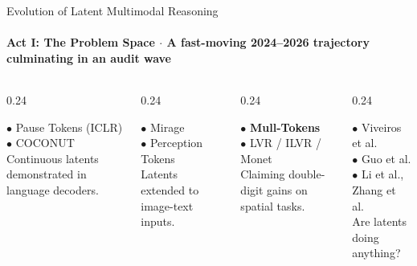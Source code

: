 \documentclass[aspectratio=169, 10pt]{beamer}
\begin{document}
\begin{frame}{Evolution of Latent Multimodal Reasoning}
  \framesubtitle{Act I: The Problem Space $\cdot$ A fast-moving 2024--2026 trajectory culminating in an audit wave}
  
  \vspace{2pt}
  \begin{columns}[T]
    \begin{column}{0.24\textwidth}
      \begin{tcolorbox}[metriccard, title=\textbf{2024: Foundations}]
        \scriptsize
        $\bullet$ Pause Tokens (ICLR)\\
        $\bullet$ COCONUT\\
        Continuous latents demonstrated in language decoders.
      \end{tcolorbox}
    \end{column}
    \begin{column}{0.24\textwidth}
      \begin{tcolorbox}[metriccard, title=\textbf{2025: Multimodal}]
        \scriptsize
        $\bullet$ Mirage\\
        $\bullet$ Perception Tokens\\
        Latents extended to image-text inputs.
      \end{tcolorbox}
    \end{column}
    \begin{column}{0.24\textwidth}
      \begin{tcolorbox}[accentcard, title=\textbf{Early 2026}]
        \scriptsize
        $\bullet$ \textbf{Mull-Tokens}\\
        $\bullet$ LVR / ILVR / Monet\\
        Claiming double-digit gains on spatial tasks.
      \end{tcolorbox}
    \end{column}
    \begin{column}{0.24\textwidth}
      \begin{tcolorbox}[alertcard, title=\textbf{Late 2026: Audits}]
        \scriptsize
        $\bullet$ Viveiros et al.\\
        $\bullet$ Guo et al.\\
        $\bullet$ Li et al., Zhang et al.\\
        \alert{Are latents doing anything?}
      \end{tcolorbox}
    \end{column}
  \end{columns}
  

\end{frame}
\end{document}

